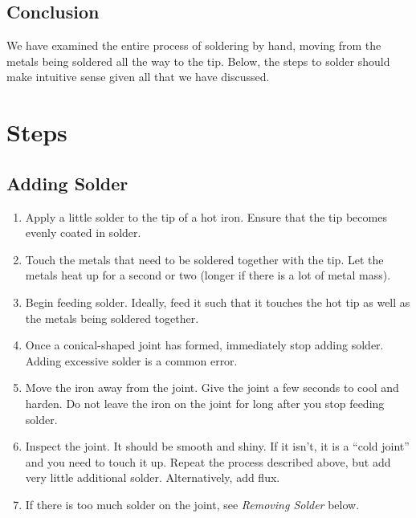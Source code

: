 \subsection{Conclusion}
We have examined the entire process of soldering by hand, moving from the metals being soldered all the way to the tip. Below, the steps to solder should make intuitive sense given all that we have discussed.

\pagebreak

\section{Steps}
\subsection{Adding Solder}
\begin{enumerate}
    \item Apply a little solder to the tip of a hot iron. Ensure that the tip becomes evenly coated in solder.
    \item Touch the metals that need to be soldered together with the tip. Let the metals heat up for a second or two (longer if there is a lot of metal mass).
    \item Begin feeding solder. Ideally, feed it such that it touches the hot tip as well as the metals being soldered together.
    \item Once a conical-shaped joint has formed, immediately stop adding solder. Adding excessive solder is a common error.
    \item Move the iron away from the joint. Give the joint a few seconds to cool and harden. Do not leave the iron on the joint for long after you stop feeding solder.
    \item Inspect the joint. It should be smooth and shiny. If it isn't, it is a ``cold joint'' and you need to touch it up. Repeat the process described above, but add very little additional solder. Alternatively, add flux.
    \item If there is too much solder on the joint, see \textit{Removing Solder} below.
\end{enumerate}
